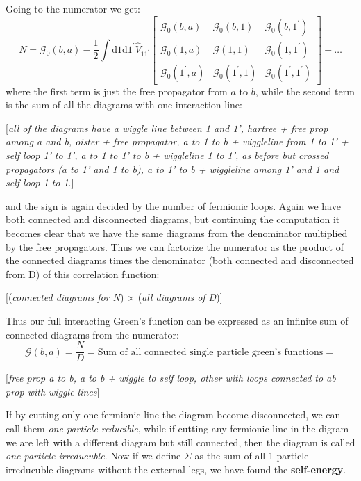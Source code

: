 Going to the numerator we get:
\[
    N = \mathcal{G}_0(b,a) - \frac{1}{2} \int \mathrm{d}1 \mathrm{d}1^{\prime} \hat{V}_{11^{\prime}} \begin{bmatrix}
        \mathcal{G}_0(b, a)           & \mathcal{G}_0(b,1)           & \mathcal{G}_0(b, 1^{\prime})          \\
        \mathcal{G}_0(1, a)           & \mathcal{G}(1, 1)            & \mathcal{G}_0(1 , 1^{\prime})         \\
        \mathcal{G}_0 (1^{\prime}, a) & \mathcal{G}_0(1^{\prime}, 1) & \mathcal{G}_0(1^{\prime}, 1^{\prime})
    \end{bmatrix} + \dots
\]
where the first term is just the free propagator from \(a\) to \(b\), while the second term is the sum of all the diagrams with one interaction line:

[\textit{all of the diagrams have a wiggle line between 1 and 1', hartree + free prop among a and b, oister + free propagator, a to 1 to b + wiggleline from 1 to 1' + self loop 1' to 1', a to 1 to 1' to b + wiggleline 1 to 1', as before but crossed propagators (a to 1' and 1 to b), a to 1' to b + wiggleline among 1' and 1 and self loop 1 to 1}.]

and the sign is again decided by the number of fermionic loops. Again we have both connected and disconnected diagrams, but continuing the computation it becomes clear that we have the same diagrams from the denominator multiplied by the free propagators. Thus we can factorize the numerator as the product of the connected diagrams times the denominator (both connected and disconnected from D) of this correlation function:

[(\textit{connected diagrams for N}) \(\times\) (\textit{all diagrams of D})]

Thus our full interacting Green's function can be expressed as an infinite sum of connected diagrams from the numerator:
\[
    \mathcal{G}(b,a) = \frac{N}{D} = \text{Sum of all connected single particle green's functions} =
\]

[\textit{free prop a to b, a to b + wiggle to self loop, other with loops connected to ab prop with wiggle lines}]

If by cutting only one fermionic line the diagram become disconnected, we can call them \textit{one particle reducible}, while if cutting any fermionic line in the digram we are left with a different diagram but still connected, then the diagram is called \textit{one particle irreducuble}. Now if we define \(\Sigma\) as the sum of all 1 particle irreducuble diagrams without the external legs, we have found the \textbf{self-energy}.

